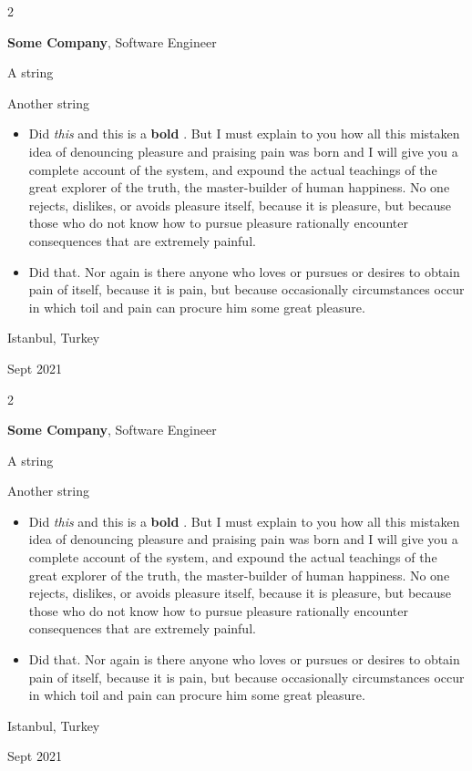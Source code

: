 \documentclass[10pt, letterpaper]{article}
\newenvironment{summary}{
    \begin{description}[
        topsep=0.10 cm,
        parsep=0.10 cm,
        partopsep=0pt,
        itemsep=0pt,
        leftmargin=0.4 cm + 10pt
    ]
}{
    \end{description}
} %
\newenvironment{highlights}{
    \begin{itemize}[
        topsep=0.10 cm,
        parsep=0.10 cm,
        partopsep=0pt,
        itemsep=0pt,
        leftmargin=0.4 cm + 10pt
    ]
}{
    \end{itemize}
} %
\newenvironment{twocolentry}[2][]{
    \onecolentry
    \def\secondColumn{#2}
    \setcolumnwidth{\fill, 4.5 cm}
    \begin{paracol}{2}
}{
    \switchcolumn \raggedleft \secondColumn
    \end{paracol}
    \endonecolentry
} %
\let\hrefWithoutArrow\href
\renewcommand{\href}[2]{\hrefWithoutArrow{#1}{\ifthenelse{\equal{#2}{}}{ }{#2 }\raisebox{.15ex}{\footnotesize \faExternalLink*}}}
\begin{document}
        \begin{twocolentry}{
            Istanbul, Turkey

        Sept 2021
        }
            \textbf{Some \textnormal{Company}}, Software Engineer
            \begin{summary}
                \item A string
                \item Another string
            \end{summary}
            \begin{highlights}
                \item Did \textit{this} and this is a \textbf{bold} \href{https://example.com}{link}. But I must explain to you how all this mistaken idea of denouncing pleasure and praising pain was born and I will give you a complete account of the system, and expound the actual teachings of the great explorer of the truth, the master-builder of human happiness. No one rejects, dislikes, or avoids pleasure itself, because it is pleasure, but because those who do not know how to pursue pleasure rationally encounter consequences that are extremely painful.
                \item Did that. Nor again is there anyone who loves or pursues or desires to obtain pain of itself, because it is pain, but because occasionally circumstances occur in which toil and pain can procure him some great pleasure.
            \end{highlights}
        \end{twocolentry}


        \vspace{0.2 cm}

        \begin{twocolentry}{
            Istanbul, Turkey

        Sept 2021
        }
            \textbf{Some \textnormal{Company}}, Software Engineer
            \begin{summary}
                \item A string
                \item Another string
            \end{summary}
            \begin{highlights}
                \item Did \textit{this} and this is a \textbf{bold} \href{https://example.com}{link}. But I must explain to you how all this mistaken idea of denouncing pleasure and praising pain was born and I will give you a complete account of the system, and expound the actual teachings of the great explorer of the truth, the master-builder of human happiness. No one rejects, dislikes, or avoids pleasure itself, because it is pleasure, but because those who do not know how to pursue pleasure rationally encounter consequences that are extremely painful.
                \item Did that. Nor again is there anyone who loves or pursues or desires to obtain pain of itself, because it is pain, but because occasionally circumstances occur in which toil and pain can procure him some great pleasure.
            \end{highlights}
        \end{twocolentry}
\end{document}
